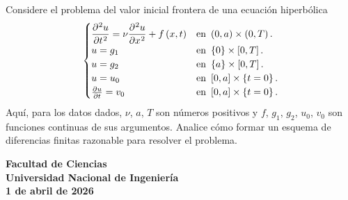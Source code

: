 \begin{questions}
	\question

	Considere el problema del valor inicial frontera de una ecuación hiperbólica
	\begin{equation*}
		\begin{cases}\displaystyle
			\diffp[2]{u}{t}=
			\nu\diffp[2]{u}{x}+
			f\left(x,t\right)  &
			\text{en }\left(0,a\right)\times\left(0,T\right).   \\
			u=g_{1}            &
			\text{en }\left\{0\right\}\times\left[0,T\right].   \\
			u=g_{2}            &
			\text{en }\left\{a\right\}\times\left[0,T\right].   \\
			u=u_{0}            &
			\text{en }\left[0,a\right]\times\left\{t=0\right\}. \\
			\diffp{u}{t}=v_{0} &
			\text{en }\left[0,a\right]\times\left\{t=0\right\}.
		\end{cases}
	\end{equation*}
	Aquí, para los datos dados, $\nu$, $a$, $T$ son números positivos y
	$f$, $g_{1}$, $g_{2}$, $u_{0}$, $v_{0}$ son funciones continuas de sus argumentos.
	Analice cómo formar un esquema de diferencias finitas razonable para resolver el problema.
\end{questions}
\vfill
\begin{flushright}\bfseries
	Facultad de Ciencias\\[2mm]
	Universidad Nacional de Ingeniería\\[2mm]
	1 de abril de 2026
\end{flushright}


